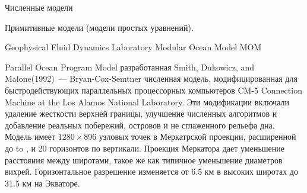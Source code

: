 \begin{chapter}{Численные модели}
\begin{section}{Примитивные модели (модели простых уравнений).}
\begin{paragraph}{Geophysical Fluid Dynamics Laboratory Modular Ocean Model MOM}
\end{paragraph}


\begin{paragraph}{Parallel Ocean Program Model}
разработанная Smith, Dukowicz, and Malone(1992)~--- Bryan-Cox-Semtner
численная модель, модифицированная для быстродействующих параллельных
процессорных компьютеров CM-5 Connection Machine at the Los Alamos
National Laboratory. Эти модификации включали удаление жесткости
верхней границы, улучшение численных алгоритмов и добавление реальных
побережий, островов и не сглаженного рельефа дна. Модель имеет $1280
\times 896$ узловых точек в Меркатрской проекции, расширенной до
 to , и 20 горизонтов по
вертикали. Проекция Меркатора дает уменьшение расстояния между
широтами, такое же как типичное уменьшение диаметров
вихрей. Горизонтальное разрешение изменяется от 6.5 км в высоких
широтах до 31.5 км на Экваторе.
%


\end{paragraph}
\end{section}
\end{chapter}
